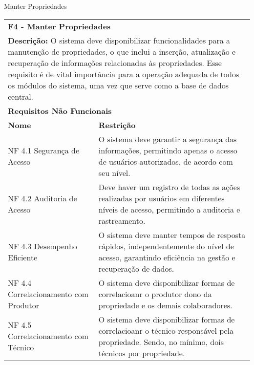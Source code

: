 \begin{tabframed}[htb]
  \caption{Manter Propriedades}
  \label{quad:requisitoManterPropriedades}
  \renewcommand{\arraystretch}{1.5}
  \begin{tabular}{|l|l|}
    \cline{1-2}
    \multicolumn{2}{|l|}{\textbf{F4 - Manter Propriedades}}
    \\ \cline{1-2}

    \multicolumn{2}{|p{15cm}|}{
    \raggedright \textbf{Descrição:} O sistema deve disponibilizar funcionalidades para a manutenção de propriedades, o que inclui a inserção, atualização e recuperação de informações relacionadas às propriedades. Esse requisito é de vital importância para a operação adequada de todos os módulos do sistema, uma vez que serve como a base de dados central.
    }
    \\ \cline{1-2}

    \multicolumn{2}{|l|}{\textbf{Requisitos Não Funcionais}}
    \\ \cline{1-2}

    \textbf{Nome}                         &
    \textbf{Restrição}
    \\ \cline{1-2}

    NF 4.1 Segurança de Acesso            &
    \multicolumn{1}{|p{8cm}|}{\raggedright O sistema deve garantir a segurança das informações, permitindo apenas o acesso de usuários autorizados, de acordo com seu nível.}
    \\ \cline{1-2}

    NF 4.2 Auditoria de Acesso            &
    \multicolumn{1}{|p{8cm}|}{\raggedright Deve haver um registro de todas as ações realizadas por usuários em diferentes níveis de acesso, permitindo a auditoria e rastreamento.}
    \\ \cline{1-2}

    NF 4.3 Desempenho Eficiente           &
    \multicolumn{1}{|p{8cm}|}{\raggedright O sistema deve manter tempos de resposta rápidos, independentemente do nível de acesso, garantindo eficiência na gestão e recuperação de dados.}
    \\ \cline{1-2}

    NF 4.4 Correlacionamento com Produtor &
    \multicolumn{1}{|p{8cm}|}{\raggedright O sistema deve disponibilizar formas de correlacioanr o produtor dono da propriedade e os demais colaboradores.}
    \\ \cline{1-2}

    NF 4.5 Correlacionamento com Técnico  &
    \multicolumn{1}{|p{8cm}|}{\raggedright O sistema deve disponibilizar formas de correlacioanr o técnico responsável pela propriedade. Sendo, no mínimo, dois técnicos por propriedade.}
    \\ \cline{1-2}


\end{tabular}
\end{tabframed}
